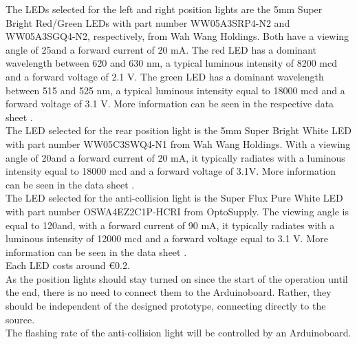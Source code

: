 The LEDs selected for the left and right position lights are the 5mm Super Bright Red/Green LEDs with part number WW05A3SRP4-N2 and WW05A3SGQ4-N2, respectively, from Wah Wang Holdings. Both have a viewing angle of 25\degree and a forward current of 20 mA. The red LED has a dominant wavelength between 620 and 630 nm, a typical luminous intensity of 8200 mcd and a forward voltage of 2.1 V. The green LED has a dominant wavelength between 515 and 525 nm, a typical luminous intensity equal to 18000 mcd and a forward voltage of 3.1 V. More information can be seen in the respective data sheet \citep{WahWangHoldingsCo.LTD} \citep{WahWangHoldingsCo.LTDb}.\\
The LED selected for the rear position light is the 5mm Super Bright White LED with part number WW05C3SWQ4-N1 from Wah Wang Holdings. With a viewing angle of 20\degree and a forward current of 20 mA, it typically radiates with a luminous intensity equal to 18000 mcd and a forward voltage of 3.1V. More information can be seen in the data sheet \citep{WahWangHoldingsCo.LTDa}.\\
The LED selected for the anti-collision light is the Super Flux Pure White LED with part number OSWA4EZ2C1P-HCRI from OptoSupply. The viewing angle is equal to 120\degree and, with a forward current of 90 mA, it typically radiates with a   luminous intensity of 12000 mcd and a forward voltage equal to 3.1 V. More information can be seen in the data sheet \citep{OptoSupply}.\\
Each LED costs around \euro{0.2}.\\

As the position lights should stay turned on since the start of the operation until the end, there is no need to connect them to the Arduino\texttrademark board. Rather, they should be independent of the designed prototype, connecting directly to the source.\\
The flashing rate of the anti-collision light will be controlled by an Arduino\texttrademark board.\\

